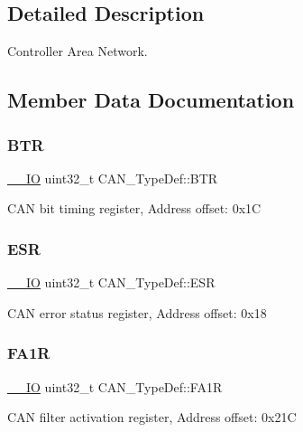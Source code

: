 \subsection{Detailed Description}
Controller Area Network. 

\subsection{Member Data Documentation}
\mbox{\label{struct_c_a_n___type_def_accad1e4155459a13369f5ad0e7c6da29}} 
\subsubsection{\texorpdfstring{BTR}{BTR}}
{\footnotesize\ttfamily \mbox{\hyperlink{core__sc300_8h_aec43007d9998a0a0e01faede4133d6be}{\+\_\+\+\_\+\+IO}} uint32\+\_\+t C\+A\+N\+\_\+\+Type\+Def\+::\+B\+TR}

C\+AN bit timing register, Address offset\+: 0x1C \mbox{\label{struct_c_a_n___type_def_ab1a1b6a7c587443a03d654d3b9a94423}} 
\subsubsection{\texorpdfstring{ESR}{ESR}}
{\footnotesize\ttfamily \mbox{\hyperlink{core__sc300_8h_aec43007d9998a0a0e01faede4133d6be}{\+\_\+\+\_\+\+IO}} uint32\+\_\+t C\+A\+N\+\_\+\+Type\+Def\+::\+E\+SR}

C\+AN error status register, Address offset\+: 0x18 \mbox{\label{struct_c_a_n___type_def_ab57a3a6c337a8c6c7cb39d0cefc2459a}} 
\subsubsection{\texorpdfstring{FA1R}{FA1R}}
{\footnotesize\ttfamily \mbox{\hyperlink{core__sc300_8h_aec43007d9998a0a0e01faede4133d6be}{\+\_\+\+\_\+\+IO}} uint32\+\_\+t C\+A\+N\+\_\+\+Type\+Def\+::\+F\+A1R}

C\+AN filter activation register, Address offset\+: 0x21C \mbox{\label{struct_c_a_n___type_def_ae2decd14b26f851e00a31b42d15293ce}} 
